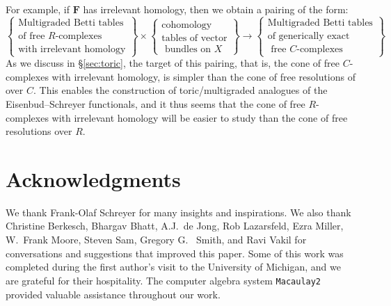 \documentclass[12pt]{amsart}
\theoremstyle{definition}
\theoremstyle{remark}
\newcommand{\FF}{\mathbf{F}}
\begin{document}
For example, if $\FF$ has irrelevant homology, then we obtain a pairing of the form:
\begin{equation*}%
\label{eqn:multipairing}
%
\left\{\begin{matrix}
\text{Multigraded Betti tables} \\ \text{of free $R$-complexes}\\
\text{with irrelevant homology}\end{matrix}\right\}
%
\times 
%
\left\{\begin{matrix}
\text{cohomology }\\
\text{tables of vector}\\
\text{ bundles on } X
\end{matrix}\right\}
%
\longrightarrow
\left\{\begin{matrix}
\text{Multigraded Betti tables} \\ \text{of generically exact }
\\ \text{ free $C$-complexes}
\end{matrix}\right\}
\end{equation*}
As we discuss in \S\ref{sec:toric}, the target of this pairing, that is, the cone of free $C$-complexes with irrelevant homology, is simpler than the cone of free resolutions of over $C$.  This enables the construction of toric/multigraded analogues of the Eisenbud--Schreyer functionals, and it thus seems that the cone of free $R$-complexes with irrelevant homology will be easier to study than the cone of free resolutions over $R$. 

\section*{Acknowledgments}
We thank Frank-Olaf Schreyer for many insights and inspirations.
We also thank Christine Berkesch, Bhargav Bhatt, A.J.~de Jong, Rob Lazarsfeld, Ezra Miller, W.~Frank Moore, Steven Sam, Gregory G.~ Smith, and Ravi Vakil for conversations and suggestions that improved this paper.  
Some of this work was completed during the first author's visit to the University of Michigan, and we are grateful for their hospitality.  The computer
algebra system \texttt{Macaulay2} \cite{M2} provided valuable assistance throughout our work.
\end{document}

